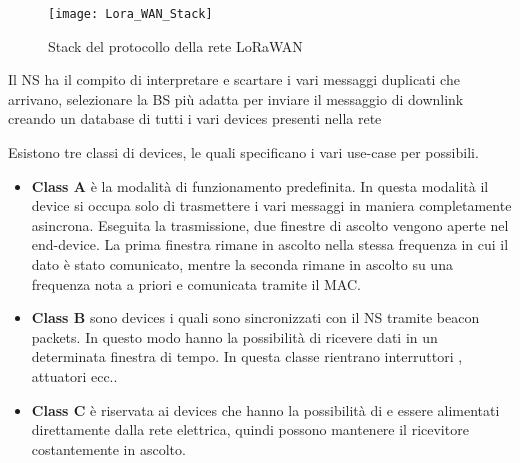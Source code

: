 \begin{figure}[h]
\centering 
\texttt{[image: Lora\_WAN\_Stack]}
\caption{Stack del protocollo della rete LoRaWAN}
\end{figure}

Il NS ha il compito di interpretare e scartare i vari messaggi duplicati che
arrivano, selezionare la BS più adatta per inviare il messaggio di downlink
creando un database di tutti i vari devices presenti nella rete 


Esistono tre classi di devices, le quali specificano i vari use-case per
possibili.
\begin{itemize}
\item \textbf{Class A} è la modalità di funzionamento predefinita. In questa
modalità il device si occupa solo di trasmettere i vari messaggi in maniera
completamente asincrona. Eseguita la trasmissione, due finestre di ascolto
vengono aperte nel end-device. La prima finestra rimane in ascolto nella stessa
frequenza in cui il dato è stato comunicato, mentre la seconda rimane in ascolto
su una frequenza nota a priori e comunicata tramite il MAC.
\item \textbf{Class B} sono devices i quali sono sincronizzati con il NS tramite
beacon packets. In questo modo hanno la possibilità di ricevere dati in un
determinata finestra di tempo. In questa classe rientrano interruttori ,
attuatori ecc..
\item \textbf{Class C} è riservata ai devices che hanno la possibilità di e
essere alimentati direttamente dalla rete elettrica, quindi possono mantenere il
ricevitore costantemente in ascolto.
\end{itemize}
